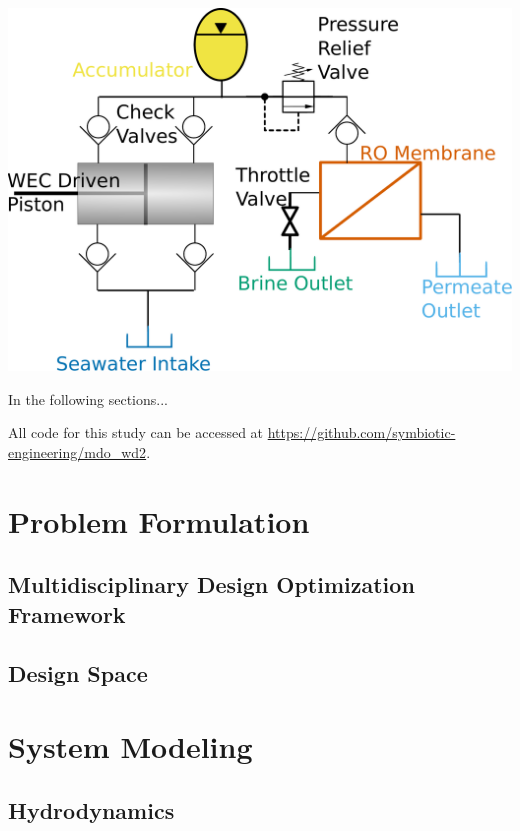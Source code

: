 \documentclass[twocolumn,10pt]{asme2e}
\begin{document}
\begin{center}
    \includegraphics[width=\linewidth]{../figs/hydraulic_circuit.pdf}
    \label{fig:hydraulics}
\end{center}

In the following sections...

All code for this study can be accessed at \href{https://github.com/symbiotic-engineering/mdo_wd2}{https://github.com/symbiotic-engineering/mdo\_wd2}.

\section{Problem Formulation}
\subsection{Multidisciplinary Design Optimization Framework}
\subsection{Design Space}

\section{System Modeling}
\subsection{Hydrodynamics}
\end{document}
